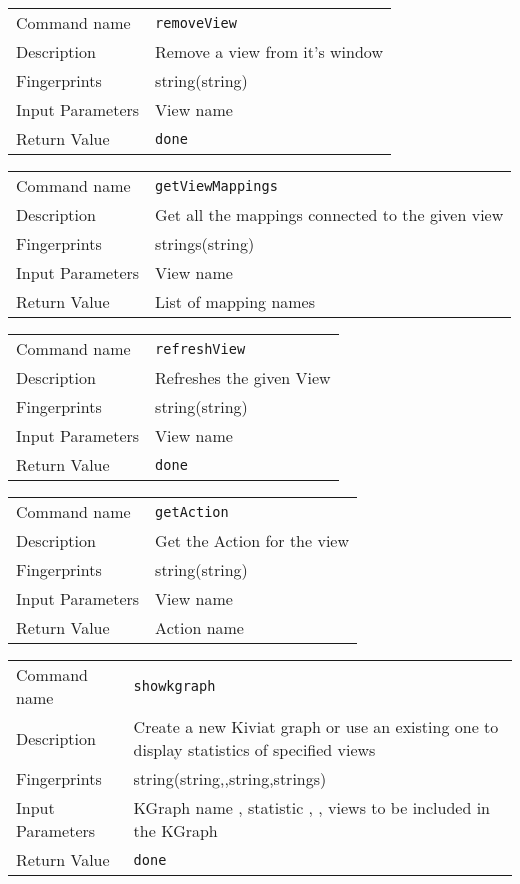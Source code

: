 \noindent
\begin{tabular}{l|p{5in}}
\hline
Command name &{\tt removeView }\\ 
Description &
 Remove a view from it's window 
 	\\
Fingerprints & string(string)\\
Input Parameters& View name \\
Return Value&{\tt done}\\
\hline
\end{tabular}
\bigskip

\noindent
\begin{tabular}{l|p{5in}}
\hline
Command name &{\tt getViewMappings }\\ 
Description &
 Get all the mappings connected to the given view 
 	\\
Fingerprints & strings(string)\\
Input Parameters& View name \\
Return Value& List of mapping names \\
\hline
\end{tabular}
\bigskip

\noindent
\begin{tabular}{l|p{5in}}
\hline
Command name &{\tt refreshView }\\ 
Description &
 Refreshes the given View 
 	\\
Fingerprints & string(string)\\
Input Parameters& View name \\
Return Value&{\tt done}\\
\hline
\end{tabular}
\bigskip

\noindent
\begin{tabular}{l|p{5in}}
\hline
Command name &{\tt getAction }\\ 
Description &
 Get the Action for the view 
 	\\
Fingerprints & string(string)\\
Input Parameters& View name \\
Return Value& Action name \\
\hline
\end{tabular}
\bigskip

\noindent
\begin{tabular}{l|p{5in}}
\hline
Command name &{\tt showkgraph }\\ 
Description &
 Create a new Kiviat graph or use an existing one to display statistics of specified views 
 	\\
Fingerprints & string(string,,string,strings)\\
Input Parameters& KGraph name , statistic , , views to be included in the KGraph \\
Return Value&{\tt done}\\
\hline
\end{tabular}
\bigskip

